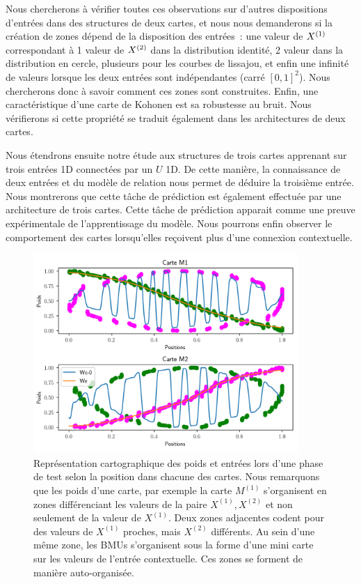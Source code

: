 \documentclass[../main]{subfiles}
\begin{document}
Nous chercherons à vérifier toutes ces observations sur d'autres dispositions d'entrées dans des structures de deux cartes, et nous nous demanderons si la création de zones dépend de la disposition des entrées~: une valeur de $X^{({1})}$ correspondant à 1 valeur de $X^{({2})}$ dans la distribution identité, 2 valeur dans la distribution en cercle, plusieurs pour les courbes de lissajou, et enfin une infinité de valeurs lorsque les deux entrées sont indépendantes (carré $[0,1]^2$). 
Nous chercherons donc à savoir comment ces zones sont construites. Enfin, une caractéristique d'une carte de Kohonen est sa robustesse au bruit. Nous vérifierons si cette propriété se traduit également dans les architectures de deux cartes.

Nous étendrons ensuite notre étude aux structures de trois cartes apprenant sur trois entrées 1D connectées par un $U$ 1D. De cette manière, la connaissance de deux entrées et du modèle de relation nous permet de déduire la troisième entrée. Nous montrerons que cette tâche de prédiction est également effectuée par une architecture de trois cartes. Cette tâche de prédiction apparait comme une preuve expérimentale de l'apprentissage du modèle.
Nous pourrons enfin observer le comportement des cartes lorsqu'elles reçoivent plus d'une connexion contextuelle.

\begin{figure}
	\centering\includegraphics[width=0.9\textwidth]{2som_cercle_w.pdf}
	\caption{Représentation cartographique des poids et entrées lors d'une phase de test selon la position dans chacune des cartes. Nous remarquons que les poids d'une carte, par exemple la carte $M^{(1)}$ s'organisent en zones différenciant les valeurs de la paire $X^{(1)}, X^{(2)}$ et non seulement de la valeur de $X^{(1)}$. Deux zones adjacentes codent pour des valeurs de $X^{(1)}$ proches, mais $X^{(2)}$ différents. Au sein d'une même zone, les BMUs s'organisent sous la forme d'une mini carte sur les valeurs de l'entrée contextuelle. Ces zones se forment de manière auto-organisée. \label{fig:w}}
\end{figure}
\end{document}
